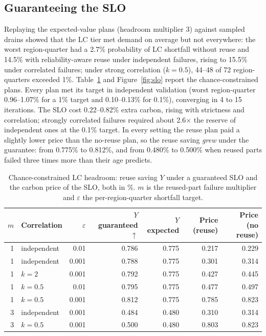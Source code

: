 \documentclass[11pt]{article}
\begin{document}
\subsection{Guaranteeing the SLO}
Replaying the expected-value plans (headroom multiplier 3) against sampled drains showed that the LC tier met demand on average but not everywhere: the worst region-quarter had a 2.7\% probability of LC shortfall without reuse and 14.5\% with reliability-aware reuse under independent failures, rising to 15.5\% under correlated failures; under strong correlation ($k=0.5$), 44--48 of 72 region-quarters exceeded 1\%. Table~\ref{tab:slo} and Figure~\ref{fig:slo} report the chance-constrained plans. Every plan met its target in independent validation (worst region-quarter 0.96--1.07\% for a 1\% target and 0.10--0.13\% for 0.1\%), converging in 4 to 15 iterations. The SLO cost 0.22--0.82\% extra carbon, rising with strictness and correlation; strongly correlated failures required about 2.6$\times$ the reserve of independent ones at the 0.1\% target. In every setting the reuse plan paid a slightly lower price than the no-reuse plan, so the reuse saving \emph{grew} under the guarantee: from 0.775\% to 0.812\%, and from 0.480\% to 0.500\% when reused parts failed three times more than their age predicts.

\begin{table}[t]
  \centering
  \caption{Chance-constrained LC headroom: reuse saving $Y$ under a guaranteed SLO and the carbon price of the SLO, both in \%. $m$ is the reused-part failure multiplier and $\varepsilon$ the per-region-quarter shortfall target.}
  \label{tab:slo}
  \begin{tabular}{rlrrrrr}
    \toprule
    $m$ & Correlation & $\varepsilon$ & $Y$ guaranteed $\uparrow$ & $Y$ expected & Price (reuse) & Price (no reuse) \\
    \midrule
    1 & independent & 0.01 & 0.786 & 0.775 & 0.217 & 0.229 \\
    1 & independent & 0.001 & 0.788 & 0.775 & 0.301 & 0.314 \\
    1 & $k=2$ & 0.001 & 0.792 & 0.775 & 0.427 & 0.445 \\
    1 & $k=0.5$ & 0.01 & 0.795 & 0.775 & 0.477 & 0.497 \\
    1 & $k=0.5$ & 0.001 & 0.812 & 0.775 & 0.785 & 0.823 \\
    3 & independent & 0.001 & 0.484 & 0.480 & 0.310 & 0.314 \\
    3 & $k=0.5$ & 0.001 & 0.500 & 0.480 & 0.803 & 0.823 \\
    \bottomrule
  \end{tabular}
\end{table}
\end{document}

